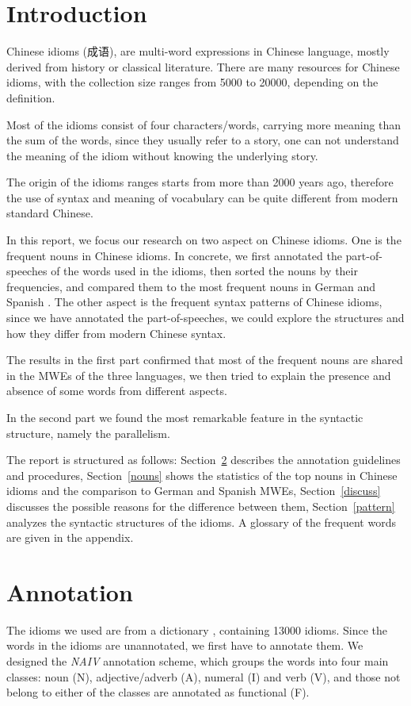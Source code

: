\section{Introduction}
Chinese idioms (成语), are multi-word expressions in Chinese language, mostly derived from history or classical literature. There are many resources for Chinese idioms, with the collection size ranges from 5000 to 20000, depending on the definition.

Most of the idioms consist of four characters/words, carrying more meaning than the sum of the words, since they usually refer to a story, one can not understand the meaning of the idiom without knowing the underlying story.

The origin of the idioms ranges starts from more than 2000 years ago, therefore the use of syntax and meaning of vocabulary can be quite different from modern standard Chinese. 

In this report, we focus our research on two aspect on Chinese idioms.
One is the frequent nouns in Chinese idioms. In concrete, we first annotated the part-of-speeches of the words used in the idioms, then sorted the nouns by their frequencies, and compared them to the most frequent nouns in German and Spanish \citep{mahlow:2013, Duden:2008, Seco:2004}. 
The other aspect is the frequent syntax patterns of Chinese idioms, since we have annotated the part-of-speeches, we could explore the structures and how they differ from modern Chinese syntax.

The results in the first part confirmed that most of the frequent nouns are shared in the MWEs of the three languages, we then tried to explain the presence and absence of some words from different aspects.

In the second part we found the most remarkable feature in the syntactic structure, namely the parallelism. 

The report is structured as follows: Section~\ref{anno} describes the annotation guidelines and procedures, Section~\ref{nouns} shows the statistics of the top nouns in Chinese idioms and the comparison to German and Spanish MWEs, Section~\ref{discuss} discusses the possible reasons for the difference between them, Section~\ref{pattern} analyzes the syntactic structures of the idioms. A glossary of the frequent words are given in the appendix.

\section{Annotation}\label{anno}
The idioms we used are from a dictionary \citep{song:2014}, containing 13000 idioms. 
Since the words in the idioms are unannotated, we first have to annotate them. We designed the {\em NAIV} annotation scheme, which  groups the words into four main classes: noun (N), adjective/adverb (A), numeral (I) and verb (V), and those not belong to either of the classes are annotated as functional (F). 


